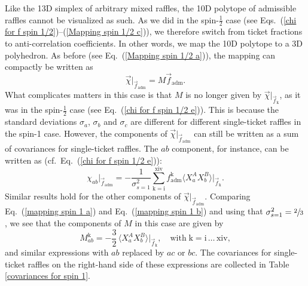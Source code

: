 Like the 13D simplex of arbitrary mixed raffles, the 10D polytope of admissible raffles cannot be visualized as such. As we did in the spin-$\frac12$ case (see Eqs.\ (\ref{chi for f spin 1/2})--(\ref{Mapping spin 1/2 c})), we therefore switch from ticket fractions to anti-correlation coefficients. In other words, we map the 10D polytope to a 3D polyhedron. As before (see Eq.\ (\ref{Mapping spin 1/2 a})), the mapping can compactly be written as
\begin{equation}
\vec{\chi} \big|_{\vec{f}_{\mathrm{adm}}} = M \vec{f}_{\mathrm{adm}}.
\label{mapping spin 1 a}
\end{equation}
What complicates matters in this case is that $M$ is no longer given by $\vec{\chi} \big|_{\vec{f}_{\mathrm{k}}}$, as it was in the spin-$\frac12$ case (see Eq.\ (\ref{chi for f spin 1/2 e})). This is because the standard deviations $\sigma_a$,  $\sigma_b$ and  $\sigma_c$ are different for different single-ticket raffles in the spin-1 case. However, the components of $\vec{\chi} \big|_{\vec{f}_{\mathrm{adm}}}$ can still be written as a sum of  covariances for single-ticket raffles. The $ab$ component, for instance, can be written as (cf.\ Eq.\ (\ref{chi for f spin 1/2 e})):
\begin{equation}
\chi_{ab} \big|_{\vec{f}_{\mathrm{adm}}} = - \frac{1}{\sigma_{s=1}^2} \sum_{\mathrm{k = i}}^{\mathrm{xiv}} f^{\mathrm{k}}_{\mathrm{adm}} \langle X^A_a X^B_b \rangle \Big|_{\vec{f}_{\mathrm{k}}}.
\label{mapping spin 1 b}
\end{equation}
Similar results hold for the other components of $\vec{\chi} \big|_{\vec{f}_{\mathrm{adm}}}$. Comparing Eq.\ (\ref{mapping spin 1 a}) and Eq.\ (\ref{mapping spin 1 b}) and using that $\sigma_{s=1}^2 = \sfrac23$, we see that the components of $M$ in this case are given by 
\begin{equation}
M^{\mathrm{k}}_{ab} = - \frac32 \, \langle X^A_a X^B_b \rangle \Big|_{\vec{f}_{\mathrm{k}}}, \quad \mathrm{with \; k = i \, \ldots \, xiv},
\label{M_ab^i spin-1}
\end{equation}
and similar expressions with $ab$ replaced by $ac$ or $bc$. The covariances for single-ticket raffles on the right-hand side of these expressions are collected in Table \ref{covariances for spin 1}. 

